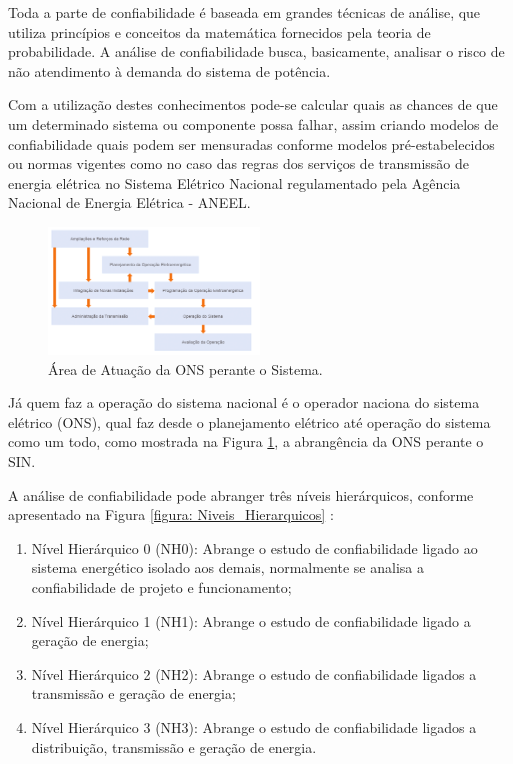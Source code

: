 \documentclass[lettersize,journal]{IEEEtran}
\begin{document}
Toda a parte de confiabilidade é baseada em grandes técnicas de análise, que utiliza princípios e conceitos da matemática fornecidos pela teoria de probabilidade\cite{Armando2022}. A análise de confiabilidade busca, basicamente, analisar o risco de não atendimento à demanda do sistema de potência.

Com a utilização destes conhecimentos pode-se calcular quais as chances de que um determinado sistema ou componente possa falhar, assim criando modelos de confiabilidade quais podem ser mensuradas conforme modelos pré-estabelecidos ou normas vigentes como no caso das regras dos serviços de transmissão de energia elétrica no Sistema Elétrico Nacional regulamentado pela Agência Nacional de Energia Elétrica - ANEEL.

\begin{figure}[h]
\includegraphics[width=0.5\textwidth]{Figuras/ONS_ABRANGENCIA.png}
\centering
\caption{Área de Atuação da ONS perante o Sistema.}
\label{figura: ONS_AREA}
\end{figure}

\newpage

Já quem faz a operação do sistema nacional é o operador naciona do sistema elétrico (ONS), qual faz desde o planejamento elétrico até operação do sistema como um todo, como mostrada na Figura \ref{figura: ONS_AREA}, a abrangência da ONS perante o SIN.


A análise de confiabilidade pode abranger três níveis
hierárquicos, conforme apresentado na Figura \ref{figura: Niveis_Hierarquicos} \cite{Cassula2003}:
\begin{enumerate}
	\item Nível Hierárquico 0 (NH0): Abrange o estudo de confiabilidade ligado ao sistema energético isolado aos demais, normalmente se analisa a confiabilidade de projeto e funcionamento;
	\item Nível Hierárquico 1 (NH1): Abrange o estudo de confiabilidade ligado a geração de energia;
	\item Nível Hierárquico 2 (NH2): Abrange o estudo de confiabilidade ligados a transmissão e geração de energia;
	\item Nível Hierárquico 3 (NH3): Abrange o estudo de confiabilidade ligados a distribuição, transmissão e geração de energia.
\end{enumerate}
\end{document}
